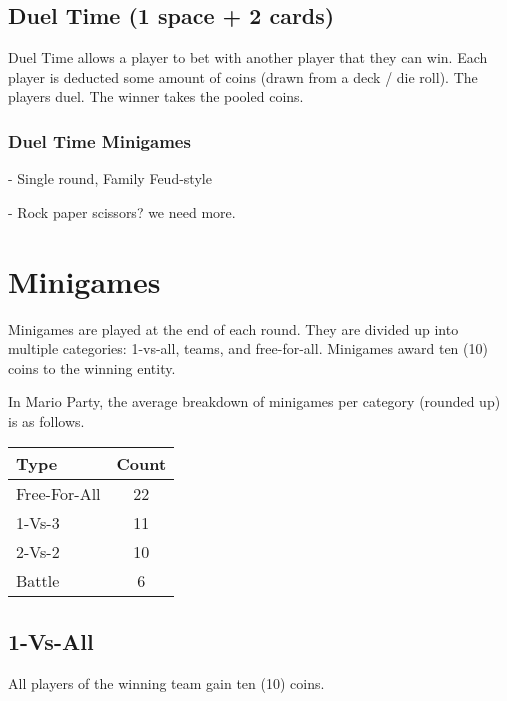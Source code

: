 \documentclass{article}
\begin{document}
\subsection{Duel Time (1 space + 2 cards)}

Duel Time allows a player to bet with another player that they can win.
Each player is deducted some amount of coins (drawn from a deck / die roll).
The players duel.
The winner takes the pooled coins.

\subsubsection{Duel Time Minigames}

\begin{description}[style=nextline]
\item[Mario Feud] - Single round, Family Feud-style
\item[...] - Rock paper scissors? we need more.
\end{description}

\section{Minigames}

Minigames are played at the end of each round.  They are divided up into multiple
categories: 1-vs-all, teams, and free-for-all.  Minigames award ten (10) coins
to the winning entity.
\vspace*{2ex}

\noindent
In Mario Party, the average breakdown of minigames per category (rounded up) is as follows.
\vspace*{2ex}

\begin{tabular}{l|c}
\textbf{Type} & \textbf{Count} \\
\hline
Free-For-All & 22 \\
1-Vs-3 & 11 \\
2-Vs-2 & 10 \\
Battle & 6 \\
\end{tabular}

\subsection{1-Vs-All}

All players of the winning team gain ten (10) coins.

\begin{description}[style=nextline]
\item[...]
\end{description}
\end{document}
